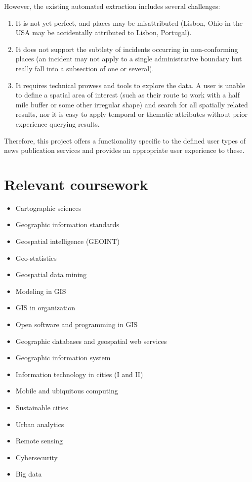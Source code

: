 However, the existing automated extraction includes several challenges:
\begin{enumerate}
	\item It is not yet perfect, and places may be misattributed (Lisbon, Ohio in the USA may be accidentally attributed to Lisbon, Portugal).
	\item It does not support the subtlety of incidents occurring in non-conforming places (an incident may not apply to a single administrative boundary but really fall into a subsection of one or several).
	\item It requires technical prowess and tools to explore the data. A user is unable to define a spatial area of interest (such as their route to work with a half mile buffer or some other irregular shape) and search for all spatially related results, nor it is easy to apply temporal or thematic attributes without prior experience querying results. 
\end{enumerate}

Therefore, this project offers a functionality specific to the defined user types of news publication services and provides an appropriate user experience to these.

\newpage
\section{Relevant coursework}
\begin{itemize}
	\item{} Cartographic sciences
	\item{} Geographic information standards
	\item{} Geospatial intelligence (GEOINT)
	\item{} Geo-statistics
	\item{} Geospatial data mining
	\item{} Modeling in GIS
	\item{} GIS in organization
	\item{} Open software and programming in GIS
	\item{} Geographic databases and geospatial web services
	\item{} Geographic information system
	\item{} Information technology in cities (I and II)
	\item{} Mobile and ubiquitous computing
	\item{} Sustainable cities
	\item{} Urban analytics
	\item{} Remote sensing
	\item{} Cybersecurity
	\item{} Big data
\end{itemize}